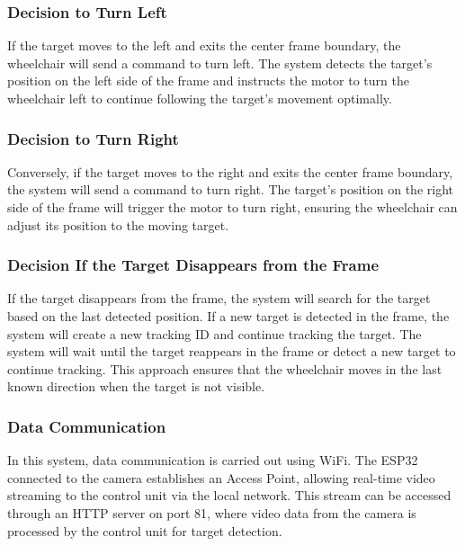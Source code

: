 \vspace{5pt}
\subsubsection*{Decision to Turn Left}
\label{subsubsec:decisionturnleft}

If the target moves to the left and exits the center frame boundary, the wheelchair will send a command to turn left. The system detects the target's position on the left side of the frame and instructs the motor to turn the wheelchair left to continue following the target's movement optimally.

\vspace{5pt}
\subsubsection*{Decision to Turn Right}
\label{subsubsec:decisionturnright}

Conversely, if the target moves to the right and exits the center frame boundary, the system will send a command to turn right. The target's position on the right side of the frame will trigger the motor to turn right, ensuring the wheelchair can adjust its position to the moving target.

\vspace{5pt}
\subsubsection*{Decision If the Target Disappears from the Frame}
\label{subsubsec:decisiontargetdisappears}

If the target disappears from the frame, the system will search for the target based on the last detected position. If a new target is detected in the frame, the system will create a new tracking ID and continue tracking the target. The system will wait until the target reappears in the frame or detect a new target to continue tracking. This approach ensures that the wheelchair moves in the last known direction when the target is not visible.

\vspace{5pt}
\subsubsection{Data Communication}
\label{subsubsec:datacommunication}

In this system, data communication is carried out using WiFi. The ESP32 connected to the camera establishes an Access Point, allowing real-time video streaming to the control unit via the local network. This stream can be accessed through an HTTP server on port 81, where video data from the camera is processed by the control unit for target detection.

